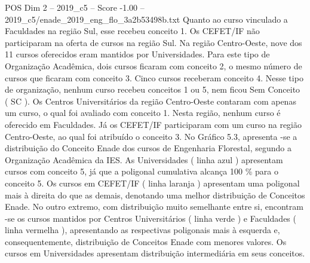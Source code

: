 \begin{textsample}{POS Dim 2 – 2019\_c5 – Score -1.00 – 2019\_c5/enade\_2019\_eng\_flo\_3a2b53498b.txt}
Quanto ao curso vinculado a Faculdades na região Sul, esse recebeu conceito 1.
Os CEFET/IF não participaram na oferta de cursos na região Sul.
Na região Centro-Oeste, nove dos 11 cursos oferecidos eram mantidos por Universidades.
Para este tipo de Organização Acadêmica, dois cursos ficaram com conceito 2, o mesmo número de cursos que ficaram com conceito 3.
Cinco cursos receberam conceito 4.
Nesse tipo de organização, nenhum curso recebeu conceitos 1 ou 5, nem ficou Sem Conceito ( SC ).
Os Centros Universitários da região Centro-Oeste contaram com apenas um curso, o qual foi avaliado com conceito 1.
Nesta região, nenhum curso é oferecido em Faculdades.
Já os CEFET/IF participaram com um curso na região Centro-Oeste, ao qual foi atribuído o conceito 3.
No Gráfico 5.3, apresenta -se a distribuição do Conceito Enade dos cursos de Engenharia Florestal, segundo a Organização Acadêmica da IES.
As Universidades ( linha azul ) apresentam cursos com conceito 5, já que a poligonal cumulativa alcança 100 \% para o conceito 5.
Os cursos em CEFET/IF ( linha laranja ) apresentam uma poligonal mais à direita do que as demais, denotando uma melhor distribuição de Conceitos Enade.
No outro extremo, com distribuição muito semelhante entre si, encontram -se os cursos mantidos por Centros Universitários ( linha verde ) e Faculdades ( linha vermelha ), apresentando as respectivas poligonais mais à esquerda e, consequentemente, distribuição de Conceitos Enade com menores valores.
Os cursos em Universidades apresentam distribuição intermediária em seus conceitos.

\end{textsample}
